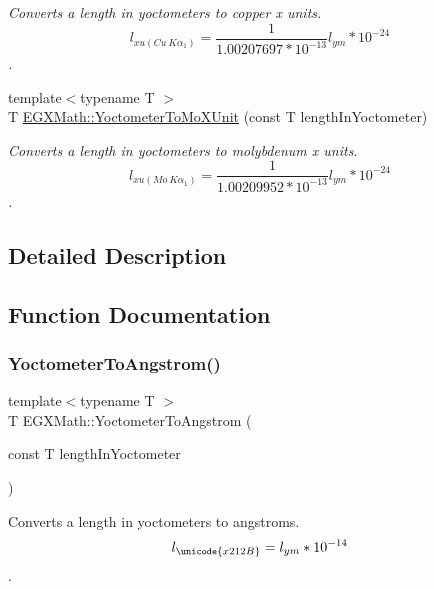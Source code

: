\begin{DoxyCompactItemize}
\begin{DoxyCompactList}\small\item\em Converts a length in yoctometers to copper x units. \[ l_{xu(Cu\ K\alpha_1)}= \frac{1}{1.00207697*10^{-13}} l_{ym} * 10^{-24}\]. \end{DoxyCompactList}\item 
{\footnotesize template$<$typename T $>$ }\\T \mbox{\hyperlink{group___e_g_x_math-_conversions-_length_conversions-_yoctometer-_non-_s_i_ga6a6a1fb3ecc97e377fc728c03327048e}{E\+G\+X\+Math\+::\+Yoctometer\+To\+Mo\+X\+Unit}} (const T length\+In\+Yoctometer)
\begin{DoxyCompactList}\small\item\em Converts a length in yoctometers to molybdenum x units. \[ l_{xu(Mo\ K\alpha_1)}=\frac{1}{1.00209952*10^{-13}} l_{ym} * 10^{-24}\]. \end{DoxyCompactList}\end{DoxyCompactItemize}


\subsection{Detailed Description}


\subsection{Function Documentation}
\mbox{\label{group___e_g_x_math-_conversions-_length_conversions-_yoctometer-_non-_s_i_ga1189896c419175e90e23cea9d8f6b52a}} 
\subsubsection{\texorpdfstring{Yoctometer\+To\+Angstrom()}{YoctometerToAngstrom()}}
{\footnotesize\ttfamily template$<$typename T $>$ \\
T E\+G\+X\+Math\+::\+Yoctometer\+To\+Angstrom (\begin{DoxyParamCaption}\item[{const T}]{length\+In\+Yoctometer }\end{DoxyParamCaption})}



Converts a length in yoctometers to angstroms. \[ l_{\unicode{x212B}}=l_{ym} * 10^{-14} \]. 

